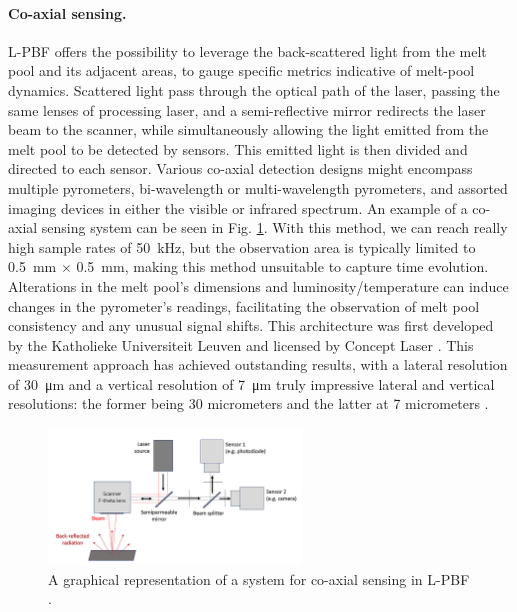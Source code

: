 \paragraph{Co-axial sensing.} L-PBF offers the possibility to leverage the back-scattered light from the melt pool and its adjacent areas, to gauge specific metrics indicative of melt-pool dynamics. Scattered light pass through the optical path of the laser, passing the same lenses of processing laser, and a semi-reflective mirror redirects the laser beam to the scanner, while simultaneously allowing the light emitted from the melt pool to be detected by sensors. This emitted light is then divided and directed to each sensor. Various co-axial detection designs might encompass multiple pyrometers, bi-wavelength or multi-wavelength pyrometers, and assorted imaging devices in either the visible or infrared spectrum. An example of a co-axial sensing system can be seen in Fig. \ref{fig:coaxiallaser}. With this method, we can reach really high sample rates of \SI{50}{\kilo\hertz}, but the observation area is typically limited to \SI{0.5}{\milli\metre} $\times$ \SI{0.5}{\milli\metre}, making this method unsuitable to capture time evolution. Alterations in the melt pool's dimensions and luminosity/temperature can induce changes in the pyrometer's readings, facilitating the observation of melt pool consistency and any unusual signal shifts. This architecture was first developed by the Katholieke Universiteit Leuven and licensed by Concept Laser \cite{leach_-machine_2020, kruth_jean-pierre_feedback_2007, berumen_quality_2010}. This measurement approach has achieved outstanding results, with a lateral resolution of \SI{30}{\micro\metre} and a vertical resolution of \SI{7}{\micro\metre} truly impressive lateral and vertical resolutions: the former being 30 micrometers and the latter at 7 micrometers \cite{fleming_tracking_2020}.
\begin{figure}
    \centering
    \includegraphics[width = 0.6\textwidth]{Images/coaxial laser.png}
    \caption[Co-axial sensing system.]{A graphical representation of a system for co-axial sensing in L-PBF \cite{leach_-machine_2020}.}
    \label{fig:coaxiallaser}
\end{figure}


